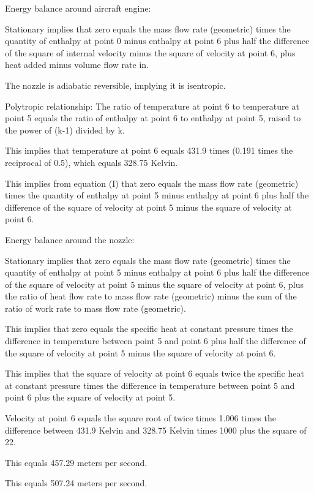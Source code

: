 Energy balance around aircraft engine:

Stationary implies that zero equals the mass flow rate (geometric) times the quantity of enthalpy at point 0 minus enthalpy at point 6 plus half the difference of the square of internal velocity minus the square of velocity at point 6, plus heat added minus volume flow rate in.

The nozzle is adiabatic reversible, implying it is isentropic.

Polytropic relationship:
The ratio of temperature at point 6 to temperature at point 5 equals the ratio of enthalpy at point 6 to enthalpy at point 5, raised to the power of (k-1) divided by k.

This implies that temperature at point 6 equals 431.9 times (0.191 times the reciprocal of 0.5), which equals 328.75 Kelvin.

This implies from equation (I) that zero equals the mass flow rate (geometric) times the quantity of enthalpy at point 5 minus enthalpy at point 6 plus half the difference of the square of velocity at point 5 minus the square of velocity at point 6.

Energy balance around the nozzle:

Stationary implies that zero equals the mass flow rate (geometric) times the quantity of enthalpy at point 5 minus enthalpy at point 6 plus half the difference of the square of velocity at point 5 minus the square of velocity at point 6, plus the ratio of heat flow rate to mass flow rate (geometric) minus the sum of the ratio of work rate to mass flow rate (geometric).

This implies that zero equals the specific heat at constant pressure times the difference in temperature between point 5 and point 6 plus half the difference of the square of velocity at point 5 minus the square of velocity at point 6.

This implies that the square of velocity at point 6 equals twice the specific heat at constant pressure times the difference in temperature between point 5 and point 6 plus the square of velocity at point 5.

Velocity at point 6 equals the square root of twice times 1.006 times the difference between 431.9 Kelvin and 328.75 Kelvin times 1000 plus the square of 22.

This equals 457.29 meters per second.

This equals 507.24 meters per second.